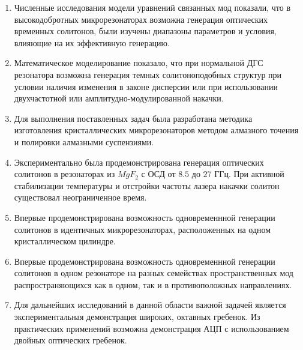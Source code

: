 \begin{enumerate}
  \item Численные исследования модели уравнений связанных мод показали, что в высокодобротных микрорезонаторах возможна генерация оптических временных солитонов, были изучены диапазоны параметров и условия, влияющие на их эффективную генерацию.
  \item Математическое моделирование показало, что при нормальной ДГС резонатора возможна генерация темных солитоноподобных структур при условии наличия изменения в законе дисперсии или при использовании двухчастотной или амплитудно-модулированной накачки. 
  \item Для выполнения поставленных задач была разработана методика изготовления кристаллических микрорезонаторов методом алмазного точения и полировки алмазными суспензиями.
  \item Экспериментально была продемонстрирована генерация оптических солитонов в резонаторах из $MgF_2$ с ОСД от $8.5$ до $27$ ГГц. При активной стабилизации температуры и отстройки частоты лазера накачки солитон существовал неограниченное время.
  \item Впервые продемонстрирована возможность одновременнной генерации солитонов в идентичных микрорезонаторах, расположенных на одном кристаллическом цилиндре.
  \item Впервые продемонстрирована возможность одновременнной генерации солитонов в одном резонаторе на разных семействах пространственных мод распространяющихся как в одном, так и в противоположных направлениях.
  \item Для дальнейших исследований в данной области важной задачей является экспериментальная демонстрация широких, октавных гребенок. Из практических применений возможна демонстрация АЦП с использованием двойных оптических гребенок.
\end{enumerate}
